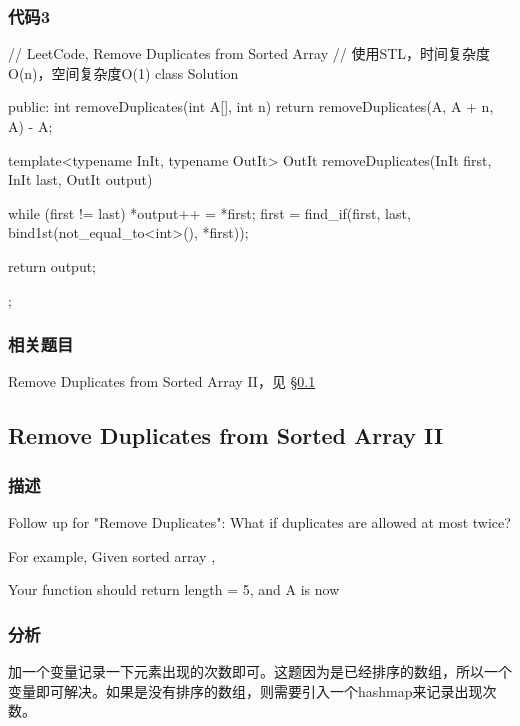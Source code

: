 \subsubsection{代码3}
\begin{Code}
// LeetCode, Remove Duplicates from Sorted Array
// 使用STL，时间复杂度O(n)，空间复杂度O(1)
class Solution {
public:
    int removeDuplicates(int A[], int n) {
        return removeDuplicates(A, A + n, A) - A;
    }

    template<typename InIt, typename OutIt>
    OutIt removeDuplicates(InIt first, InIt last, OutIt output) {
        while (first != last) {
            *output++ = *first;
            first = find_if(first, last,
                    bind1st(not_equal_to<int>(), *first));
        }

        return output;
    }
};
\end{Code}


\subsubsection{相关题目}

\begindot
\item Remove Duplicates from Sorted Array II，见 \S \ref{sec:remove-duplicates-from-sorted-array-ii}
\myenddot


\subsection{Remove Duplicates from Sorted Array II}
\label{sec:remove-duplicates-from-sorted-array-ii}


\subsubsection{描述}
Follow up for "Remove Duplicates":
What if duplicates are allowed at most twice?

For example,
Given sorted array ,

Your function should return length = 5, and A is now \code{[1,1,2,2,3]}


\subsubsection{分析}
加一个变量记录一下元素出现的次数即可。这题因为是已经排序的数组，所以一个变量即可解决。如果是没有排序的数组，则需要引入一个hashmap来记录出现次数。


